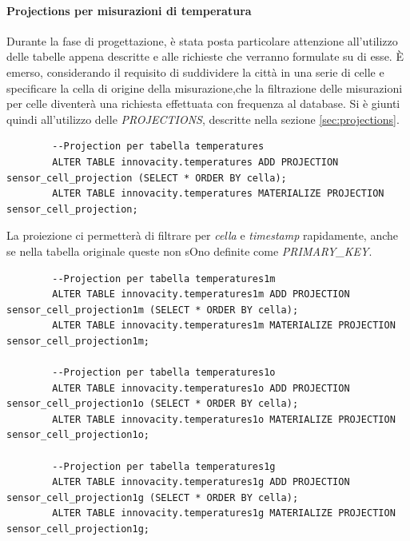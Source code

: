    
    
    \paragraph{Projections per misurazioni di temperatura} \label{sec:temp_projections}
    Durante la fase di progettazione, è stata posta particolare attenzione all'utilizzo delle tabelle appena descritte e alle richieste che verranno formulate su di esse. È emerso, considerando il requisito di suddividere la città in una serie di celle e specificare la cella di origine della misurazione,che la filtrazione delle misurazioni per celle diventerà una richiesta effettuata con frequenza al database.
    Si è giunti quindi all'utilizzo delle \textit{PROJECTIONS}, descritte nella sezione \ref{sec:projections}.

    \begin{lstlisting}
        --Projection per tabella temperatures
        ALTER TABLE innovacity.temperatures ADD PROJECTION sensor_cell_projection (SELECT * ORDER BY cella);
        ALTER TABLE innovacity.temperatures MATERIALIZE PROJECTION sensor_cell_projection;
    \end{lstlisting}

    La proiezione ci permetterà di filtrare per \textit{cella} e \textit{timestamp} rapidamente, anche se nella tabella originale queste non sOno definite come \textit{PRIMARY\_KEY}.


    \begin{lstlisting}
        --Projection per tabella temperatures1m
        ALTER TABLE innovacity.temperatures1m ADD PROJECTION sensor_cell_projection1m (SELECT * ORDER BY cella);
        ALTER TABLE innovacity.temperatures1m MATERIALIZE PROJECTION sensor_cell_projection1m;

        --Projection per tabella temperatures1o
        ALTER TABLE innovacity.temperatures1o ADD PROJECTION sensor_cell_projection1o (SELECT * ORDER BY cella);
        ALTER TABLE innovacity.temperatures1o MATERIALIZE PROJECTION sensor_cell_projection1o;

        --Projection per tabella temperatures1g
        ALTER TABLE innovacity.temperatures1g ADD PROJECTION sensor_cell_projection1g (SELECT * ORDER BY cella);
        ALTER TABLE innovacity.temperatures1g MATERIALIZE PROJECTION sensor_cell_projection1g;
    \end{lstlisting}

